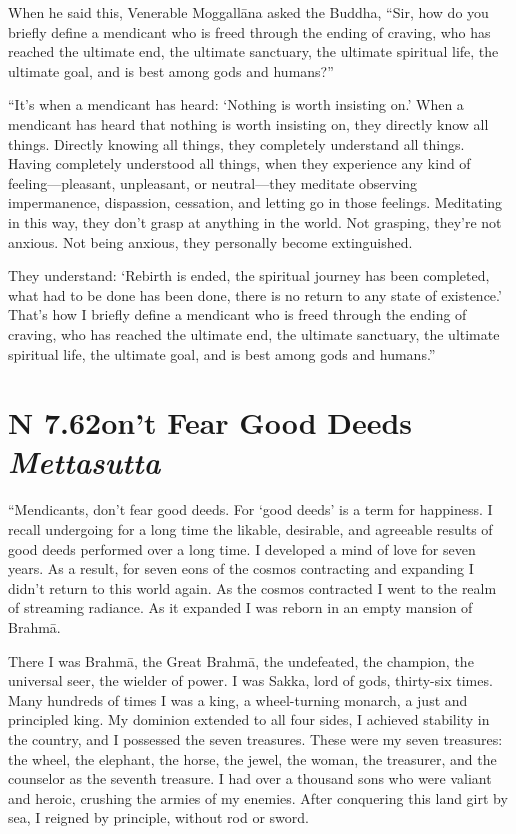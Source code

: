 \documentclass[12pt,openany]{book}%
\newcommand*{\suttatitleacronym}[1]{\smaller[2]{#1}\vspace*{.3em}}
\newcommand*{\suttatitletranslation}[1]{\linebreak{#1}}
\newcommand*{\suttatitleroot}[1]{\linebreak\smaller[2]\itshape{#1}}
\newcommand*{\tocacronym}[1]{\hspace*{-3.3em}{#1}\quad}
\newcommand*{\toctranslation}[1]{#1}
\newcommand*{\tocroot}[1]{(\textit{#1})}
\begin{document}
When he said this, Venerable \textsanskrit{Moggallāna} asked the Buddha, “Sir, how do you briefly define a mendicant who is freed through the ending of craving, who has reached the ultimate end, the ultimate sanctuary, the ultimate spiritual life, the ultimate goal, and is best among gods and humans?” 

“It’s when a mendicant has heard: ‘Nothing is worth insisting on.’ When a mendicant has heard that nothing is worth insisting on, they directly know all things. Directly knowing all things, they completely understand all things. Having completely understood all things, when they experience any kind of feeling—pleasant, unpleasant, or neutral—they meditate observing impermanence, dispassion, cessation, and letting go in those feelings. Meditating in this way, they don’t grasp at anything in the world. Not grasping, they’re not anxious. Not being anxious, they personally become extinguished. 

They understand: ‘Rebirth is ended, the spiritual journey has been completed, what had to be done has been done, there is no return to any state of existence.’ That’s how I briefly define a mendicant who is freed through the ending of craving, who has reached the ultimate end, the ultimate sanctuary, the ultimate spiritual life, the ultimate goal, and is best among gods and humans.” 

%
\section*{{\suttatitleacronym AN 7.62}{\suttatitletranslation Don’t Fear Good Deeds }{\suttatitleroot Mettasutta}}
\addcontentsline{toc}{section}{\tocacronym{AN 7.62} \toctranslation{Don’t Fear Good Deeds } \tocroot{Mettasutta}}

“Mendicants, don’t fear good deeds. For ‘good deeds’ is a term for happiness. I recall undergoing for a long time the likable, desirable, and agreeable results of good deeds performed over a long time. I developed a mind of love for seven years. As a result, for seven eons of the cosmos contracting and expanding I didn’t return to this world again. As the cosmos contracted I went to the realm of streaming radiance. As it expanded I was reborn in an empty mansion of \textsanskrit{Brahmā}. 

There I was \textsanskrit{Brahmā}, the Great \textsanskrit{Brahmā}, the undefeated, the champion, the universal seer, the wielder of power. I was Sakka, lord of gods, thirty-six times. Many hundreds of times I was a king, a wheel-turning monarch, a just and principled king. My dominion extended to all four sides, I achieved stability in the country, and I possessed the seven treasures. These were my seven treasures: the wheel, the elephant, the horse, the jewel, the woman, the treasurer, and the counselor as the seventh treasure. I had over a thousand sons who were valiant and heroic, crushing the armies of my enemies. After conquering this land girt by sea, I reigned by principle, without rod or sword. 
\end{document}
